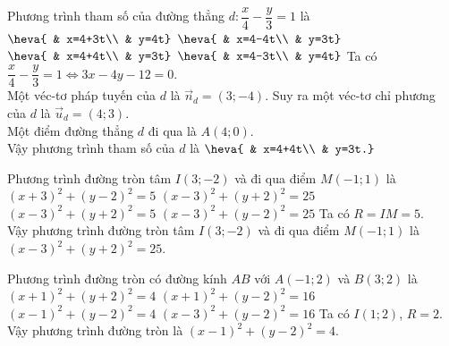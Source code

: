 \begin{ex}%
Phương trình tham số của đường thẳng $d\colon \dfrac{x}{4}-\dfrac{y}{3}=1$ là
\choice
{$\heva{ & x=4+3t\\ & y=4t}$}
{$\heva{ & x=4-4t\\ & y=3t}$}
{\True$\heva{ & x=4+4t\\ & y=3t}$}
{$\heva{ & x=4-3t\\ & y=4t}$}
\loigiai
{
Ta có $\dfrac{x}{4}-\dfrac{y}{3}=1\Leftrightarrow 3x-4y-12=0$.\\
Một véc-tơ pháp tuyến của $d$ là $\overrightarrow{n}_{d}=(3;-4)$. Suy ra một véc-tơ chỉ phương của $d$ là $\overrightarrow{u}_{d}=(4;3)$.\\
Một điểm đường thẳng $d$ đi qua là $A(4;0)$.\\
Vậy phương trình tham số của $d$ là $\heva{ & x=4+4t\\ & y=3t.}$
}
\end{ex}

\begin{ex}%
Phương trình đường tròn tâm $I(3;-2)$ và đi qua điểm $M(-1;1)$ là
\choice
{$(x+3)^2+(y-2)^2=5$}
{\True $(x-3)^2+(y+2)^2=25$}
{$(x-3)^2+(y+2)^2=5$}
{$(x-3)^2+(y-2)^2=25$}
\loigiai
{
Ta có $R=IM=5$.\\
Vậy phương trình đường tròn tâm $I(3;-2)$ và đi qua điểm $M(-1;1)$ là $(x-3)^2+(y+2)^2=25$.
}
\end{ex}

\begin{ex}%
Phương trình đường tròn có đường kính $AB$ với $A(-1;2)$ và $B(3;2)$ là
\choice
{$(x+1)^2+(y+2)^2=4$}
{$(x+1)^2+(y-2)^2=16$}
{\True $(x-1)^2+(y-2)^2=4$}
{$(x-3)^2+(y-2)^2=16$}
\loigiai
{
Ta có $I(1;2)$, $R=2$.\\
Vậy phương trình đường tròn là $(x-1)^2+(y-2)^2=4$.
}
\end{ex}



